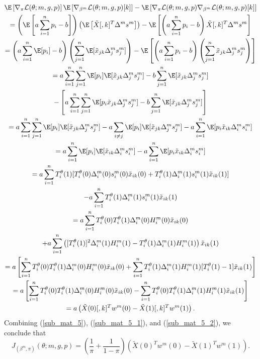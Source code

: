 \documentclass[12pt]{article}
\begin{document}
\begin{appendices}
\begin{multline}
\E \left[\nabla_\pi \mathcal{L}(\theta; m, g, p) \right] \E\left[\nabla_{\beta^m} \mathcal{L}(\theta; m, g, p)[k] \right] - \E \left[\nabla_{\pi}\mathcal{L}(\theta; m,g,p) \nabla_{\beta^m}\mathcal{L}(\theta; m,g,p)[k] \right] \\= \left(\E \left[ a \sum_{i=1}^n p_i - b \right] \right) \left(\E\left[ \tilde{X}[,k]^T \Delta^m s^m \right] \right) - \E \left[ \left( a \sum_{i=1}^n p_i - b \right) \tilde{X}[,k]^T \Delta^m s^m \right] \\ = \left( a \sum_{i=1}^n \E[p_i] - b \right) \left( \sum_{j=1}^n \E [ \tilde{x}_{jk}\Delta^m_js^m_j] \right) - \E \left[ \left( a \sum_{i=1}^n p_i - b \right) \left( \sum_{j=1}^n \tilde{x}_{jk} \Delta^m_j s^m_j \right) \right] \\ = a \sum_{i=1}^n \sum_{j=1}^n \E [p_i] \E[ \tilde{x}_{jk} \Delta^m_j s^m_j] - b \sum_{j=1}^n \E[\tilde{x}_{jk} \Delta^m_j s^m_j] \\ - \left[ a \sum_{i=1}^n \sum_{j=1}^n \E [ p_i \tilde{x}_{jk} \Delta^m_j s^m_j] - b \sum_{j=1}^n \E[\tilde{x}_{jk} \Delta^m_j s^m_j] \right] \\ =  a \sum_{i=1}^n \sum_{j=1}^n \E[p_i] \E[\tilde{x}_{jk} \Delta^m_j s^m_j] - a\sum_{i \neq j} \E[p_i] \E[\tilde{x}_{jk} \Delta^m_j s^m_j] - a\sum_{i=1}^n \E[ p_i \tilde{x}_{ik} \Delta^m_i s^m_i ] \\ = a \sum_{i=1}^n \E[p_i] \E[ \tilde{x}_{ik} \Delta^m_i s^m_i] - a \sum_{i=1}^n \E[p_i \tilde{x}_{ik} \Delta^m_i s^m_i] \\ = a \sum_{i=1}^n T^\theta_i(1) [T^\theta_i(0) \Delta^m_i(0) s^m_i(0) \tilde{x}_{ik}(0) + T^\theta_i(1) \Delta^m_i(1) s^m_i(1) \tilde{x}_{ik}(1)] \\ - a \sum_{i=1}^n T^\theta_i(1)\Delta^m_i(1)s^m_i(1)\tilde{x}_{ik}(1) \\ = a \sum_{i=1}^n T^\theta_i(0)T^\theta_i(1) \Delta_i^m(0)H^m_i(0)\tilde{x}_{ik}(0) \\ + a \sum_{i=1}^n \left( [T^\theta_i(1)]^2 \Delta^m_i(1)H^m_i(1) - T^\theta_i(1)\Delta^m_i(1)H^m_i(1) \right) \tilde{x}_{ik}(1)  \\ =a \left[ \sum_{i=1}^n T^\theta_i(0) T^\theta_i(1) \Delta^m_i(0) H^m_i(0) \tilde{x}_{ik}(0) + \sum_{i=1}^n T^\theta_i(1)\Delta^m_i(1)H^m_i(1)[T^\theta_i(1) - 1] \tilde{x}_{ik}(1) \right] \\ = a \left[ \sum_{i=1}^n T^\theta_i(0) T^\theta_i(1) \Delta^m_i(0) H^m_i(0) \tilde{x}_{ik}(0) - \sum_{i=1}^n T^\theta_i(0) T^\theta_i(1) \Delta^m_i(1) H^m_i(1) \tilde{x}_{ik}(1) \right] \\ = a\left(\tilde{X}(0)[,k]^T w^m(0) - \tilde{X}(1)[,k]^T w^m(1)  \right).
\end{multline}
Combining (\ref{sub_mat_5}), (\ref{sub_mat_5_1}), and (\ref{sub_mat_5_2}), we conclude that
\begin{equation}\label{sub_mat_5_formula} J_{(\beta^m, \pi)}(\theta; m, g, p) = \left( \frac{1}{\pi} + \frac{1}{1 - \pi} \right) \left( \tilde{X}(0)^T w^m(0) - \tilde{X}(1)^T w^m(1)\right). \end{equation}


\end{appendices}
\end{document}
